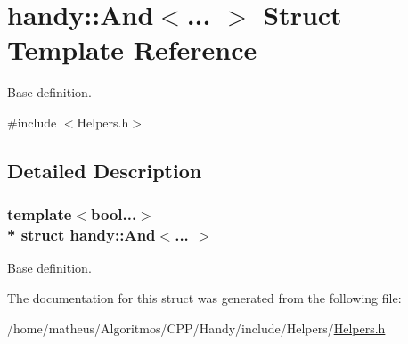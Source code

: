 \hypertarget{structhandy_1_1And}{}\section{handy\+:\+:And$<$... $>$ Struct Template Reference}
\label{structhandy_1_1And}


Base definition.  




{\ttfamily \#include $<$Helpers.\+h$>$}



\subsection{Detailed Description}
\subsubsection*{template$<$bool...$>$\\*
struct handy\+::\+And$<$... $>$}

Base definition. 

The documentation for this struct was generated from the following file\+:\begin{DoxyCompactItemize}
\item 
/home/matheus/\+Algoritmos/\+C\+P\+P/\+Handy/include/\+Helpers/\hyperlink{Helpers_2Helpers_8h}{Helpers.\+h}\end{DoxyCompactItemize}

